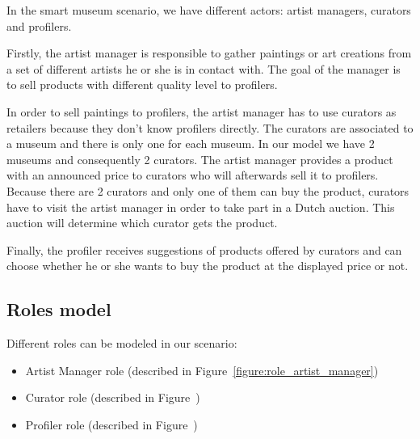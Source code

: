 \documentclass[a4paper,11pt]{report}
\begin{document}
  In the smart museum scenario, we have different actors: artist managers, curators 
  and profilers.
  
  Firstly, the artist manager is responsible to gather paintings or art creations 
  from a set of different artists he or she is in contact with. The goal of the manager 
  is to sell products with different quality level to profilers.
  
  In order to sell paintings to profilers, the artist manager has to use curators as retailers 
  because they don't know profilers directly. The curators are associated to a museum and there
  is only one for each museum. In our model we have 2 museums and consequently 2 curators. The artist manager 
  provides a product with an announced price to curators who will afterwards
  sell it to profilers. Because there are 2 curators and only one of them can buy 
  the product, curators have to visit the artist manager in order to take part in a Dutch auction. 
  This auction will determine which curator gets the product.
  
  Finally, the profiler receives suggestions of products offered by curators and can choose whether he or 
  she wants to buy the product at the displayed price or not.
  
  
  \subsection{Roles model}
  
  Different roles can be modeled in our scenario:
  \begin{itemize}
   \item Artist Manager role (described in Figure~\ref{figure:role_artist_manager})
   \item Curator role (described in Figure~) %
   \item Profiler role (described in Figure~) %
  \end{itemize}
\end{document}
